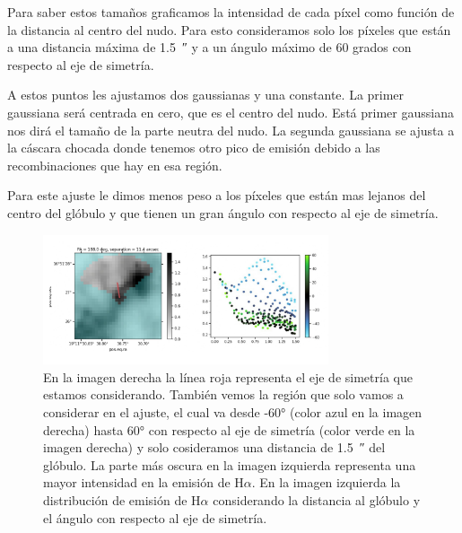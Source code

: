 \documentclass{book}
\begin{document}
Para saber estos tamaños graficamos la intensidad de cada píxel como función de la distancia al centro del nudo. Para esto consideramos solo los píxeles que están a una distancia máxima de \SI{1.5}{\arcsecond} y a un ángulo máximo de 60 grados con respecto al eje de simetría.

A estos puntos les ajustamos dos gaussianas y una constante. La primer gaussiana será centrada en cero, que es el centro del nudo. Está primer gaussiana nos dirá el tamaño de la parte neutra del nudo. La segunda gaussiana se ajusta a la cáscara chocada donde tenemos otro pico de emisión debido a las recombinaciones que hay en esa región.

Para este ajuste le dimos menos peso a los píxeles que están mas lejanos del centro del glóbulo y que tienen un gran ángulo con respecto al eje de simetría.

\begin{figure}[h!]
    \centering
    \includegraphics[width=0.75\textwidth]{images Chapter 3/C3_mask.jpg}
    \caption{En la imagen derecha la línea roja representa el eje de simetría que estamos considerando. También vemos la región que solo vamos a considerar en el ajuste, el cual va desde \ang{-60}  (color azul en la imagen derecha) hasta \ang{60} con respecto al eje de simetría (color verde en la imagen derecha) y solo cosideramos una distancia de  \SI{1.5}{\arcsecond} del glóbulo. La parte más oscura en la imagen izquierda representa una mayor intensidad en la emisión de H$\alpha$. En la imagen izquierda la distribución de emisión de H$\alpha$ considerando la distancia al glóbulo y el ángulo con respecto al eje de simetría.}
    \label{ejemplo mascara}
\end{figure}
\end{document}
